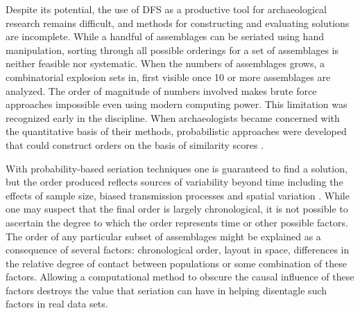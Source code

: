 \documentclass[10pt,letterpaper]{article}
\begin{document}
Despite its potential, the use of DFS as a productive tool for archaeological research remains difficult, and methods for constructing and evaluating solutions are incomplete. While a handful of assemblages can be seriated using hand manipulation, sorting through all possible orderings for a set of assemblages is neither feasible nor systematic. When the numbers of assemblages grows, a combinatorial explosion sets in, first visible once 10 or more assemblages are analyzed. The order of magnitude of numbers involved makes brute force approaches impossible even using modern computing power. This limitation was recognized early in the discipline. When archaeologists became concerned with the quantitative basis of their methods, probabilistic approaches were developed that could construct orders on the basis of similarity scores \cite{Ascher1959,Ascher1963,Brainerd1951,Kendall1963,Kendall1969,Kendall1970,Kendall1971,Kuzara1966,Matthews1963}. 

With probability-based seriation techniques one is guaranteed to find a solution, but the order produced reflects sources of variability beyond time including the effects of sample size, biased transmission processes and spatial variation \cite{Dunnell:1970aa}. While one may suspect that the final order is largely chronological, it is not possible to ascertain the degree to which the order represents time or other possible factors. The order of any particular subset of assemblages might be explained as a consequence of several factors:  chronological order, layout in space, differences in the relative degree of contact between populations \textemdash or some combination of these factors. Allowing a computational method to obscure the causal influence of these factors destroys the value that seriation can have in helping disentagle such factors in real data sets.
\end{document}
